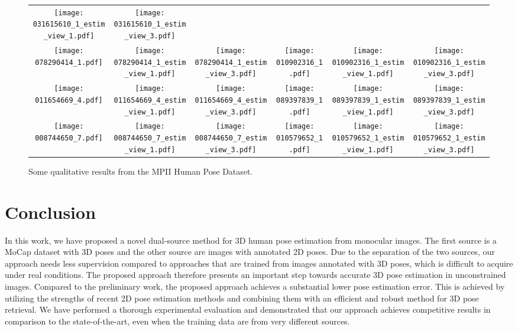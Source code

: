 \documentclass[10pt,journal,compsoc]{IEEEtran}
\begin{document}
\begin{figure*}
{\begin{tabular}{c c c | c c c}
\texttt{[image: 031615610\_1\_estim\_view\_1.pdf]} &
\texttt{[image: 031615610\_1\_estim\_view\_3.pdf]} \\ 
\texttt{[image: 078290414\_1.pdf]} &
\texttt{[image: 078290414\_1\_estim\_view\_1.pdf]} &
\texttt{[image: 078290414\_1\_estim\_view\_3.pdf]} &
\texttt{[image: 010902316\_1.pdf]} &
\texttt{[image: 010902316\_1\_estim\_view\_1.pdf]} &
\texttt{[image: 010902316\_1\_estim\_view\_3.pdf]} \\ 
\texttt{[image: 011654669\_4.pdf]} &
\texttt{[image: 011654669\_4\_estim\_view\_1.pdf]} &
\texttt{[image: 011654669\_4\_estim\_view\_3.pdf]} &
\texttt{[image: 089397839\_1.pdf]} &
\texttt{[image: 089397839\_1\_estim\_view\_1.pdf]} &
\texttt{[image: 089397839\_1\_estim\_view\_3.pdf]} \\ 
\texttt{[image: 008744650\_7.pdf]} &
\texttt{[image: 008744650\_7\_estim\_view\_1.pdf]} &
\texttt{[image: 008744650\_7\_estim\_view\_3.pdf]} &
\texttt{[image: 010579652\_1.pdf]} &
\texttt{[image: 010579652\_1\_estim\_view\_1.pdf]} &
\texttt{[image: 010579652\_1\_estim\_view\_3.pdf]} \\ 
\end{tabular}
}
\vspace{1em}
\caption{Some qualitative results from the MPII Human Pose Dataset.}
\label{fig:mpii_qualitative_results}
\end{figure*}

\section{Conclusion}\label{sec:con}
In this work, we have proposed a novel dual-source method for 3D human pose estimation from monocular images. 
The first source is a MoCap dataset with 3D poses and the other source are images with annotated 2D poses. Due to the separation of the two sources, our approach needs less supervision compared to approaches that are trained from images annotated with 3D poses, which is difficult to acquire under real conditions. The proposed approach therefore presents an important step towards accurate 3D pose estimation in unconstrained images. Compared to the preliminary work, the proposed approach achieves a substantial lower pose estimation error. This is achieved by utilizing the strengths of recent 2D pose estimation methods and combining them with an efficient and 
robust method for 3D pose retrieval. 
We have performed a thorough experimental evaluation and demonstrated that our approach achieves
competitive results in comparison to the state-of-the-art, even when the training data are from very different sources. 
\end{document}
